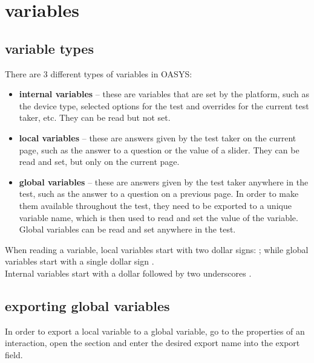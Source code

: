 \documentclass[12pt]{article} %
\begin{document}
    \section{variables}\label{sec:variables}

    \subsection{variable types}\label{subsec:variable_types}

    There are 3 different types of variables in OASYS:\\
    \begin{itemize}
        \item \textbf{internal variables} – these are variables that are set by the platform, such as the device type, selected options for the test and overrides for the current test taker, etc. They can be read but not set.
        \item \textbf{local variables} – these are answers given by the test taker on the current page, such as the answer to a question or the value of a slider. They can be read and set, but only on the current page.
        \item \textbf{global variables} – these are answers given by the test taker anywhere in the test, such as the answer to a question on a previous page. In order to make them available throughout the test, they need to be exported to a unique variable name, which is then used to read and set the value of the variable. Global variables can be read and set anywhere in the test.
    \end{itemize}

    When reading a variable, local variables start with two dollar signs: ; while global variables start with a single dollar sign .\\
    Internal variables start with a dollar followed by two underscores .\\

    \subsection{exporting global variables}\label{subsec:exporting_global_variables}

    In order to export a local variable to a global variable, go to the properties of an interaction, open the  section and enter the desired export name into the export field.\\
\end{document}
